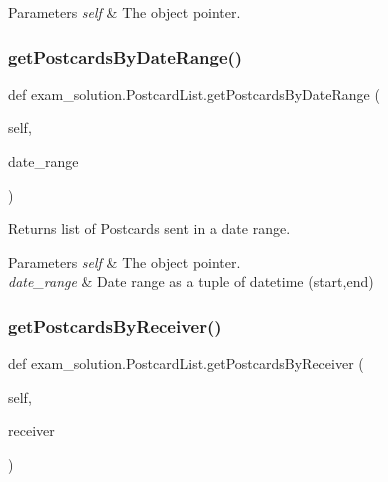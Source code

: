 \begin{DoxyParams}{Parameters}
{\em self} & The object pointer. \\
\hline
\end{DoxyParams}
\mbox{\label{classexam__solution_1_1PostcardList_aa4e768d91d72fe0b33f467119d065a87}} 
\subsubsection{\texorpdfstring{getPostcardsByDateRange()}{getPostcardsByDateRange()}}
{\footnotesize\ttfamily def exam\+\_\+solution.\+Postcard\+List.\+get\+Postcards\+By\+Date\+Range (\begin{DoxyParamCaption}\item[{}]{self,  }\item[{}]{date\+\_\+range }\end{DoxyParamCaption})}



Returns list of Postcards sent in a date range. 


\begin{DoxyParams}{Parameters}
{\em self} & The object pointer. \\
\hline
{\em date\+\_\+range} & Date range as a tuple of datetime (start,end) \\
\hline
\end{DoxyParams}
\mbox{\label{classexam__solution_1_1PostcardList_a297ba4e9d4ef6770d4da3ec0366bd7bb}} 
\subsubsection{\texorpdfstring{getPostcardsByReceiver()}{getPostcardsByReceiver()}}
{\footnotesize\ttfamily def exam\+\_\+solution.\+Postcard\+List.\+get\+Postcards\+By\+Receiver (\begin{DoxyParamCaption}\item[{}]{self,  }\item[{}]{receiver }\end{DoxyParamCaption})}



